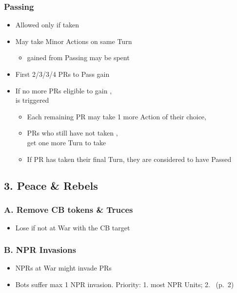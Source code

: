 \documentclass[10pt]{article}
\begin{document}
\subsubsection*{Passing}
\begin{itemize}
	\item Allowed only if  taken
	\item May take Minor Actions on same Turn
	\begin{itemize}
		\item \ducats gained from Passing may be spent
	\end{itemize}
	\item First 2/3/3/4 PRs to Pass gain \ducats
	\item If no more PRs eligible to gain \ducats,\\  is triggered
	\begin{itemize}
		\item Each remaining PR may take 1 more Action of their choice, 
		\item PRs who still have not taken ,\\ get one more Turn to take 
		\item If PR has taken their final Turn, they are considered to have Passed
	\end{itemize}
\end{itemize}

\subsection*{3. Peace \& Rebels}
\subsubsection*{A. Remove CB tokens \& Truces}
\begin{itemize}
	\item Lose  if not at War with the CB target
\end{itemize}

\subsubsection*{B. NPR Invasions }
\begin{itemize}
	\item {}NPRs at War might invade PRs
	\botrules
	\item Bots suffer max 1 NPR invasion. Priority: 1. most NPR Units; 2. \az~(p.~2)
\end{itemize}
\end{document}
